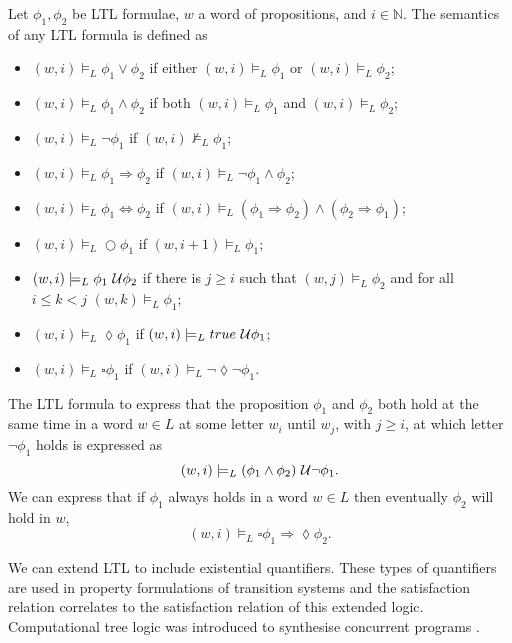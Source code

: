 \begin{defi}
Let $\phi_{1},\phi_{2}$ be LTL formulae, $w$ a word of propositions, and $i\in\mathbb{N}$. The semantics of any LTL formula is defined as
\begin{itemize}
    \item{$(w,i)\models_{L}\phi_{1}\lor\phi_{2}$ if either $(w,i)\models_{L}\phi_{1}$ or $(w,i)\models_{L}\phi_{2}$;}
    \item{$(w,i)\models_{L}\phi_{1}\land\phi_{2}$ if both $(w,i)\models_{L}\phi_{1}$ and $(w,i)\models_{L}\phi_{2}$;}
    \item{$(w,i)\models_{L}\lnot\phi_{1}$ if $(w,i)\not\models_{L}\phi_{1}$;}
    \item{$(w,i)\models_{L}\phi_{1}\Rightarrow\phi_{2}$ if $(w,i)\models_{L}\lnot\phi_{1} \land \phi_{2}$;}
    \item{$(w,i)\models_{L}\phi_{1}\Leftrightarrow\phi_{2}$ if $(w,i)\models_{L}(\phi_{1}\Rightarrow\phi_{2})\land(\phi_{2}\Rightarrow\phi_{1})$;}
    \item{$(w,i)\models_{L}\bigcirc\phi_{1}$ if $(w,i+1)\models_{L}\phi_{1}$;}
    \item{$(w,i)\models_{L}\phi_{1}\ \mathcal{U}\phi_{2}$ if there is $j\geq i$ such that $(w,j)\models_{L}\phi_{2}$ and for all $i\leq k < j$ $(w,k)\models_{L}\phi_{1}$;}
    \item{$(w,i)\models_{L}\lozenge\phi_{1}$ if $(w,i)\models_{L}true\ \mathcal{U}\phi_{1}$;}
    \item{$(w,i)\models_{L}\square\phi_{1}$ if $(w,i)\models_{L}\lnot\lozenge\lnot\phi_{1}$.}
\end{itemize}
\end{defi}


\begin{ex}
The LTL formula to express that the proposition $\phi_{1}$ and $\phi_{2}$ both hold at the same time in a word $w\in L$ at some letter $w_{i}$ until $w_{j}$, with $j\geq i$, at which letter $\lnot \phi_{1}$ holds is expressed as
\[
(w,i)\models_{L}(\phi_{1}\land\phi_{2})\ \mathcal{U} \lnot \phi_{1}.
\]
We can express that if $\phi_{1}$ always holds in a word $w\in L$ then eventually $\phi_{2}$ will hold in $w$,
\[
(w,i)\models_{L}\square\phi_{1}\Rightarrow\lozenge\phi_{2}.
\]
\end{ex}
We can extend LTL to include existential quantifiers. These types of quantifiers are used in property formulations of transition systems and the satisfaction relation correlates to the satisfaction relation of this extended logic. Computational tree logic was introduced to synthesise concurrent programs \cite{Clarke1982}.

